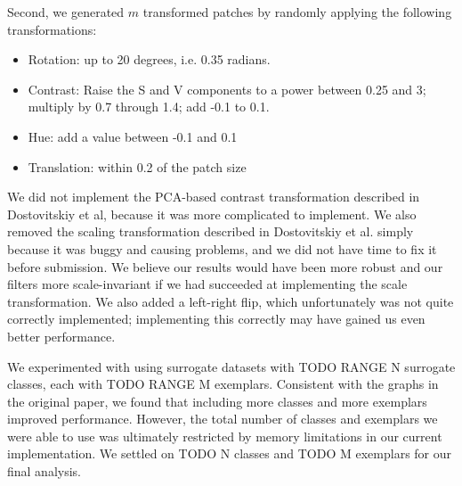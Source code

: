 \documentclass{article} %
\newenvironment{itemizedense}{
\begin{itemize}
  \setlength{\itemsep}{1pt}
  \setlength{\parskip}{0pt}
  \setlength{\parsep}{0pt}
}{\end{itemize}}
\begin{document}
Second, we generated $m$ transformed patches by randomly applying the following transformations:

\begin{itemizedense}
\item Rotation: up to 20 degrees, i.e. 0.35 radians.
\item Contrast: Raise the S and V components to a power between 0.25 and 3; multiply by 0.7 through 1.4; add -0.1 to 0.1.
\item Hue: add a value between -0.1 and 0.1
\item Translation: within 0.2 of the patch size
\end{itemizedense}

We did not implement the PCA-based contrast transformation described in Dostovitskiy et al, because it was more complicated to implement. We also removed the scaling transformation described in Dostovitskiy et al. simply because it was buggy and causing problems, and we did not have time to fix it before submission. We believe our results would have been more robust and our filters more scale-invariant if we had succeeded at implementing the scale transformation. We also added a left-right flip, which unfortunately was not quite correctly implemented; implementing this correctly may have gained us even better performance.

We experimented with using surrogate datasets with TODO RANGE N surrogate classes, each with TODO RANGE M exemplars. Consistent with the graphs in the original paper, we found that including more classes and more exemplars improved performance. However, the total number of classes and exemplars we were able to use was ultimately restricted by memory limitations in our current implementation. We settled on TODO N classes and TODO M exemplars for our final analysis.
\end{document}
